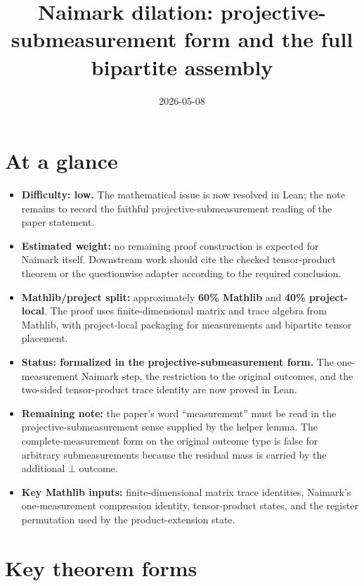 \documentclass[11pt]{article}
\title{Naimark dilation: projective-submeasurement form and the full bipartite assembly}
\author{}
\date{2026-05-08}
\begin{document}
\maketitle

\section{At a glance}

\begin{itemize}
  \item \textbf{Difficulty: low.}  The mathematical issue is now resolved in
  Lean; the note remains to record the faithful projective-submeasurement
  reading of the paper statement.
  \item \textbf{Estimated weight:} no remaining proof construction is expected
  for Naimark itself.  Downstream work should cite the checked tensor-product
  theorem or the questionwise adapter according to the required conclusion.
  \item \textbf{Mathlib/project split:} approximately \textbf{60\% Mathlib} and
  \textbf{40\% project-local}.  The proof uses finite-dimensional matrix and
  trace algebra from Mathlib, with project-local packaging for measurements and
  bipartite tensor placement.
  \item \textbf{Status: formalized in the projective-submeasurement form.}  The
  one-measurement Naimark step, the restriction to the original outcomes, and
  the two-sided tensor-product trace identity are now proved in Lean.
  \item \textbf{Remaining note:} the paper's word ``measurement'' must be read
  in the projective-submeasurement sense supplied by the helper lemma.  The
  complete-measurement form on the original outcome type is false for arbitrary
  submeasurements because the residual mass is carried by the additional
  \(\bot\) outcome.
  \item \textbf{Key Mathlib inputs:} finite-dimensional matrix trace
  identities, Naimark's one-measurement compression identity, tensor-product
  states, and the register permutation used by the product-extension state.
\end{itemize}

\section{Key theorem forms}
\end{document}
